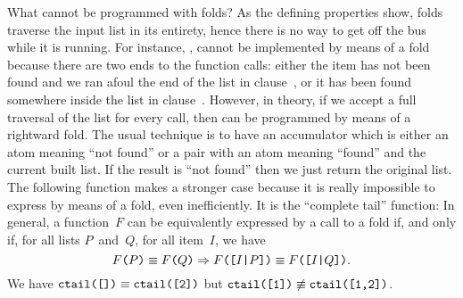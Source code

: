 What cannot be programmed with folds? As the defining properties show,
folds traverse the input list in its entirety, hence there is no way
to get off the bus while it is running. For instance,
 , 
cannot be implemented by means of a fold because there are two ends to
the function calls: either the item has not been found and we ran
afoul the end of the list in clause~\clause{\alpha}, or it has been
found somewhere inside the list in clause~\clause{\beta}. However, in
theory, if we accept a full traversal of the list for every call, then
 can be programmed by means of a rightward
fold. The usual technique is to have an accumulator which is either an
atom meaning ``not found'' or a pair with an atom meaning ``found''
and the current built list. If the result is ``not found'' then we
just return the original list. The following function makes a stronger
case because it is really impossible to express by means of a fold,
even inefficiently. It is the ``complete tail''
function:\label{code:ctail}  In general, a
function~\(F\) can be equivalently expressed by a call to a fold if,
and only if, for all lists \(P\)~and~\(Q\), for all item~\(I\), we
have\label{prop:fold}
\begin{equation}
\texttt{\(F\)(\(P\))} \mathrel{\equiv} \texttt{\(F\)(\(Q\))}
\Rightarrow
\texttt{\(F\)([\(I\)|\(P\)])}
\mathrel{\equiv}
\texttt{\(F\)([\(I\)|\(Q\)])}.\label{eq:fold_theory}
\end{equation}
We have \(\texttt{ctail([])} \mathrel{\equiv} \texttt{ctail([2])}\)
but \(\texttt{ctail([1])} \mathrel{\not\equiv}
\texttt{ctail([1,2])}\).

